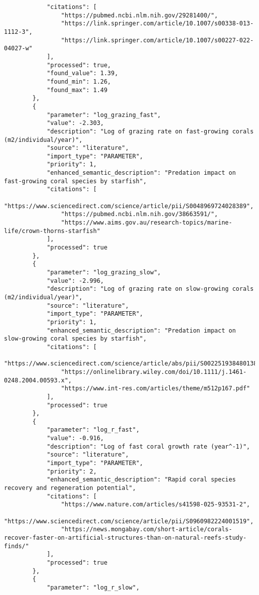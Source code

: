 \begin{lstlisting}
            "citations": [
                "https://pubmed.ncbi.nlm.nih.gov/29281400/",
                "https://link.springer.com/article/10.1007/s00338-013-1112-3",
                "https://link.springer.com/article/10.1007/s00227-022-04027-w"
            ],
            "processed": true,
            "found_value": 1.39,
            "found_min": 1.26,
            "found_max": 1.49
        },
        {
            "parameter": "log_grazing_fast",
            "value": -2.303,
            "description": "Log of grazing rate on fast-growing corals (m2/individual/year)",
            "source": "literature",
            "import_type": "PARAMETER",
            "priority": 1,
            "enhanced_semantic_description": "Predation impact on fast-growing coral species by starfish",
            "citations": [
                "https://www.sciencedirect.com/science/article/pii/S0048969724028389",
                "https://pubmed.ncbi.nlm.nih.gov/38663591/",
                "https://www.aims.gov.au/research-topics/marine-life/crown-thorns-starfish"
            ],
            "processed": true
        },
        {
            "parameter": "log_grazing_slow",
            "value": -2.996,
            "description": "Log of grazing rate on slow-growing corals (m2/individual/year)",
            "source": "literature",
            "import_type": "PARAMETER",
            "priority": 1,
            "enhanced_semantic_description": "Predation impact on slow-growing coral species by starfish",
            "citations": [
                "https://www.sciencedirect.com/science/article/abs/pii/S0022519384801381",
                "https://onlinelibrary.wiley.com/doi/10.1111/j.1461-0248.2004.00593.x",
                "https://www.int-res.com/articles/theme/m512p167.pdf"
            ],
            "processed": true
        },
        {
            "parameter": "log_r_fast",
            "value": -0.916,
            "description": "Log of fast coral growth rate (year^-1)",
            "source": "literature",
            "import_type": "PARAMETER",
            "priority": 2,
            "enhanced_semantic_description": "Rapid coral species recovery and regeneration potential",
            "citations": [
                "https://www.nature.com/articles/s41598-025-93531-2",
                "https://www.sciencedirect.com/science/article/pii/S0960982224001519",
                "https://news.mongabay.com/short-article/corals-recover-faster-on-artificial-structures-than-on-natural-reefs-study-finds/"
            ],
            "processed": true
        },
        {
            "parameter": "log_r_slow",

\end{lstlisting}
